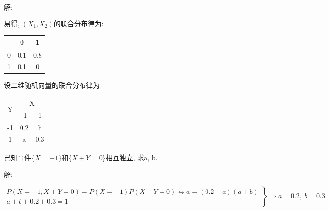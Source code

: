\documentclass[standard]{ExBook}
\begin{document}
\begin{qitems}
\vspace{-5em}

    \begin{bbox}
解: 

易得, $(X_1,X_2)$的联合分布律为:
\begin{footnotesize}
\begin{center}
    \renewcommand{\arraystretch}{1}
    \setlength{\tabcolsep}{6pt}
    \begin{tabular}{c|c|c}
	    \hline
	    \diagbox{$X_2$}{$P(X,Y)$}{$X_1$} & 0 & 1 \\
	    \hline
	    0 & 0.1 & 0.8 \\
	    \hline
	    1 & 0.1 & 0 \\
	    \hline
    \end{tabular}
\end{center}
\end{footnotesize}
    \end{bbox}

\vspace{-5em}

    \begin{bbox}
    \begin{shaded}
        \qitem
设二维随机向量的联合分布律为
\begin{center}
    \renewcommand{\arraystretch}{1}
    \setlength{\tabcolsep}{5em}
    \begin{threeparttable}
    \begin{tabular}{c|cc}
        \hline
        \multirow{2}{*}{Y} & \multicolumn{2}{c}{X}\\
        \cline{2-3}
        & -1 & 1\\
        \hline
        -1 & 0.2 & b \\
        \hline
        1 & a & 0.3\\
        \hline
    \end{tabular}
    \end{threeparttable}
\end{center}
己知事件$\{X = -1\}$和$\{X +Y =0\}$相互独立, 求a, b.
    \end{shaded}
    \end{bbox}

\vspace{-5em}

    \begin{bbox}
解: 
\vspace{-2em}
\begin{center}
\begin{equation}
    \left.
    \begin{array}{r}
        \nonumber
        P(X=-1,X+Y=0)=P(X=-1)P(X+Y=0) \Longleftrightarrow a=(0.2+a)(a+b)\\
        a+b+0.2+0.3=1
    \end{array}
    \right\}
    \Longrightarrow
    a=0.2,\ b=0.3
\end{equation}
\end{center}
    \end{bbox}


\end{qitems}
\end{document}
